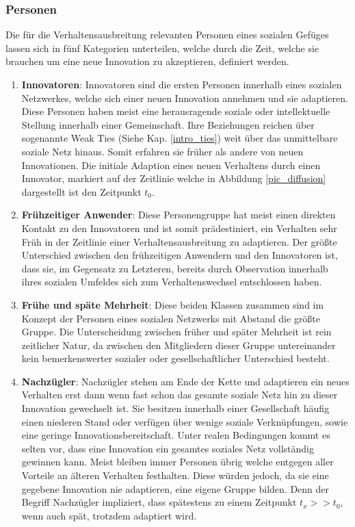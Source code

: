 \documentclass[12pt]{article}
\begin{document}
\subsubsection{Personen}
Die für die Verhaltensausbreitung relevanten Personen eines sozialen Gefüges lassen sich in fünf Kategorien unterteilen, welche durch die Zeit, welche sie brauchen um eine neue Innovation zu akzeptieren, definiert werden. \cite{Rogers03}
\begin{enumerate}
\item \textbf{Innovatoren}: Innovatoren sind die ersten Personen innerhalb eines sozialen Netzwerkes, welche sich einer neuen Innovation annehmen und sie adaptieren. Diese Personen haben meist eine herausragende soziale oder intellektuelle Stellung innerhalb einer Gemeinschaft. Ihre Beziehungen reichen über sogenannte Weak Ties (Siehe Kap. \ref{intro_ties}) weit über das unmittelbare soziale Netz hinaus. Somit erfahren sie früher als andere von neuen Innovationen. Die initiale Adaption eines neuen Verhaltens durch einen Innovator, markiert auf der Zeitlinie welche in Abbildung \ref{pic_diffusion} dargestellt ist den Zeitpunkt $t_0$.
\item \textbf{Frühzeitiger Anwender}: Diese Personengruppe hat meist einen direkten Kontakt zu den Innovatoren und ist somit prädestiniert, ein Verhalten sehr Früh in der Zeitlinie einer Verhaltensausbreitung zu adaptieren. Der größte Unterschied zwischen den frühzeitigen Anwendern und den Innovatoren ist, dass sie, im Gegensatz zu Letzteren, bereits durch Observation innerhalb ihres sozialen Umfeldes sich zum Verhaltenswechsel entschlossen haben.
\item \textbf{Frühe und späte Mehrheit}: Diese beiden Klassen zusammen sind im Konzept der Personen eines sozialen Netzwerks mit Abstand die größte Gruppe. Die Unterscheidung zwischen früher und später Mehrheit ist rein zeitlicher Natur, da zwischen den Mitgliedern dieser Gruppe untereinander kein bemerkenswerter sozialer oder gesellschaftlicher Unterschied besteht.
\item \textbf{Nachzügler}: Nachzügler stehen am Ende der Kette und adaptieren ein neues Verhalten erst dann wenn fast schon das gesamte soziale Netz hin zu dieser Innovation gewechselt ist. Sie besitzen innerhalb einer Gesellschaft häufig einen niederen Stand oder verfügen über wenige soziale Verknüpfungen, sowie eine geringe Innovationsbereitschaft. Unter realen Bedingungen kommt es selten vor, dass eine Innovation ein gesamtes soziales Netz vollständig gewinnen kann. Meist bleiben immer Personen übrig welche entgegen aller Vorteile an älteren Verhalten festhalten. Diese würden jedoch, da sie eine gegebene Innovation nie adaptieren, eine eigene Gruppe bilden. Denn der Begriff Nachzügler impliziert, dass spätestens zu einem Zeitpunkt $t_x >> t_0$, wenn auch spät, trotzdem adaptiert wird.
\end{enumerate}
\end{document}
